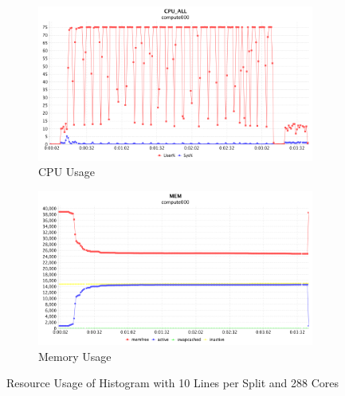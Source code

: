 \fi

\begin{figure}[h]
\centering
\begin{subfigure}{1\textwidth}
  \centering
  \includegraphics[width=1\linewidth]{figures/Hist10_72_CPU.png}
  \caption{CPU Usage}
  \label{Hist10_72_CPU}
\end{subfigure}
\begin{subfigure}{1\textwidth}
  \centering
  \includegraphics[width=1\linewidth]{figures/Hist10_72_MEM.png}
  \caption{Memory Usage}
  \label{Hist10_72_MEM}
\end{subfigure}
\caption{Resource Usage of Histogram with 10 Lines per Split and 288 Cores}
\label{Hist10_72}
\end{figure}

